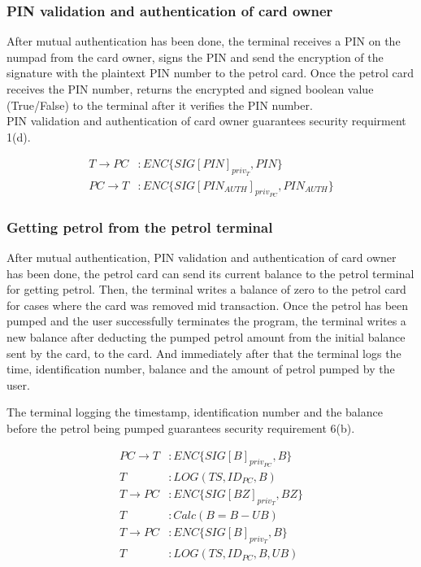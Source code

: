 \subsubsection{PIN validation and authentication of card owner}
After mutual authentication has been done, the terminal receives a PIN on the numpad from the card owner, signs the PIN and send the encryption of the signature with the plaintext PIN number to the petrol card. Once the petrol card receives the PIN number, returns the encrypted and signed boolean value (True/False) to the terminal after it verifies the PIN number. \\

PIN validation and authentication of card owner guarantees security requirment 1(d).

\begin{equation}\nonumber
\begin{split}
T \to PC&: ENC\{SIG[PIN]_{priv_T}, PIN\}\\
PC \to T&: ENC\{SIG[PIN_{AUTH}]_{priv_{PC}}, PIN_{AUTH}\}
\end{split} 
\end{equation}

\subsubsection{Getting petrol from the petrol terminal}
After mutual authentication, PIN validation and authentication of card owner has been done, the petrol card can send its current balance to the petrol terminal for getting petrol. Then, the terminal writes a balance of zero to the petrol card for cases where the card was removed mid transaction. Once the petrol has been pumped and the user successfully terminates the program, the terminal writes a new balance after deducting the pumped petrol amount from the initial balance sent by the card, to the card. And immediately after that the terminal logs the time, identification number, balance and the amount of petrol pumped by the user.

The terminal logging the timestamp, identification number and the balance before the petrol being pumped guarantees security requirement 6(b).

\begin{equation}\nonumber
\begin{split}
PC \to T&: ENC\{SIG[B]_{priv_{PC}}, B\}\\
T&: LOG(TS, ID_{PC}, B) \\
T \to PC&: ENC\{SIG[BZ]_{priv_T}, BZ\}\\
T&: Calc(B = B - UB)\\
T \to PC&: ENC\{SIG[B]_{priv_T}, B\}\\
T&: LOG(TS, ID_{PC}, B, UB)
\end{split} 
\end{equation}


